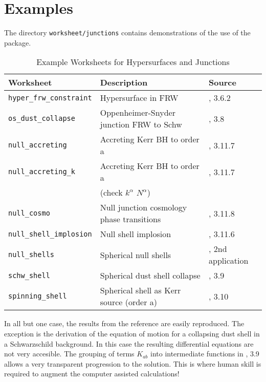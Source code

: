 \documentclass{article}
\begin{document}
\FloatBarrier
\section{Examples}
The directory \texttt{worksheet/junctions} contains demonstrations of the use of the package.\\

\renewcommand{\arraystretch}{1.5}
\begin{table}[h]
  \begin{center}
    \begin{tabular}{lll}\hline\hline
      \textbf{Worksheet} & \textbf{Description} & Source \\ \hline
   \texttt{hyper\_frw\_constraint} & Hypersurface in FRW &  \cite{poisson:2004}, 3.6.2 \\
    \texttt{os\_dust\_collapse} & Oppenheimer-Snyder junction FRW to Schw & \cite{poisson:2004}, 3.8 \\
   \texttt{null\_accreting} & Accreting Kerr BH to order a &  \cite{poisson:2004}, 3.11.7 \\
   \texttt{null\_accreting\_k} & Accreting Kerr BH to order a &  \cite{poisson:2004}, 3.11.7 \\
    & (check $k^\alpha$ $N^\alpha$) &  \\
    \texttt{null\_cosmo} & Null junction cosmology phase transitions &  \cite{poisson:2004}, 3.11.8 \\
    \texttt{null\_shell\_implosion} & Null shell implosion &  \cite{poisson:2004}, 3.11.6 \\
    \texttt{null\_shells} & Spherical null shells &  \cite{poisson:2002}, 2nd application \\
    \texttt{schw\_shell} & Spherical dust shell collapse &  \cite{poisson:2004}, 3.9 \\
    \texttt{spinning\_shell} & Spherical shell as Kerr source (order a) &  \cite{poisson:2004}, 3.10 \\
     \end{tabular}
    \caption{Example Worksheets for Hypersurfaces and Junctions}
    \label{tab:junc}
  \end{center}
\end{table}

In all but one case, the results from the reference are easily reproduced. The exception is the derivation of the equation of motion for 
a collapsing dust shell in a Schwarzschild background. In this case the resulting differential equations are not very accesible. 
The grouping of terms $K_{ab}$ into intermediate functions in \cite{poisson:2004}, 3.9 allows a very transparent progression to the solution. 
This is where human skill is required to augment the computer assisted calculations!

\vfill


\end{document}
